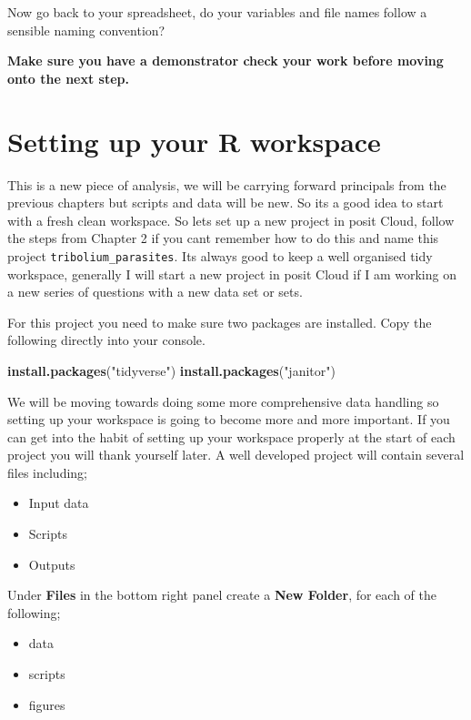 \documentclass[
]{book}
\newenvironment{Shaded}{\begin{snugshade}}{\end{snugshade}}
\newcommand{\FunctionTok}[1]{\textcolor[rgb]{0.13,0.29,0.53}{\textbf{#1}}}
\newcommand{\NormalTok}[1]{#1}
\newcommand{\StringTok}[1]{\textcolor[rgb]{0.31,0.60,0.02}{#1}}
\providecommand{\tightlist}{%
  \setlength{\itemsep}{0pt}\setlength{\parskip}{0pt}}
\begin{document}
Now go back to your spreadsheet, do your variables and file names follow a sensible naming convention?

\textbf{Make sure you have a demonstrator check your work before moving onto the next step.}

\section{Setting up your R workspace}\label{workspace}

This is a new piece of analysis, we will be carrying forward principals from the previous chapters but scripts and data will be new. So its a good idea to start with a fresh clean workspace. So lets set up a new project in posit Cloud, follow the steps from Chapter 2 if you cant remember how to do this and name this project \texttt{tribolium\_parasites}. Its always good to keep a well organised tidy workspace, generally I will start a new project in posit Cloud if I am working on a new series of questions with a new data set or sets.

For this project you need to make sure two packages are installed. Copy the following directly into your console.

\begin{Shaded}
\begin{Highlighting}[]
\FunctionTok{install.packages}\NormalTok{(}\StringTok{"tidyverse"}\NormalTok{)}
\FunctionTok{install.packages}\NormalTok{(}\StringTok{"janitor"}\NormalTok{)}
\end{Highlighting}
\end{Shaded}

We will be moving towards doing some more comprehensive data handling so setting up your workspace is going to become more and more important. If you can get into the habit of setting up your workspace properly at the start of each project you will thank yourself later. A well developed project will contain several files including;

\begin{itemize}
\tightlist
\item
  Input data
\item
  Scripts
\item
  Outputs
\end{itemize}

Under \textbf{Files} in the bottom right panel create a \textbf{New Folder}, for each of the following;

\begin{itemize}
\tightlist
\item
  data
\item
  scripts
\item
  figures
\end{itemize}
\end{document}
